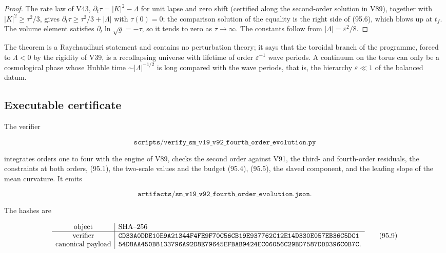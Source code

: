 \documentclass[11pt]{article}
\theoremstyle{remark}
\begin{document}
\begin{proof}
The rate law of V43, \(\partial_t\tau=|K|^2-\Lambda\) for unit lapse
and zero shift (certified along the second-order solution in V89),
together with \(|K|^2\geq\tau^2/3\), gives
\(\partial_t\tau\geq\tau^2/3+|\Lambda|\) with \(\tau(0)=0\); the
comparison solution of the equality is the right side of (95.6),
which blows up at \(t_f\).  The volume element satisfies
\(\partial_t\ln\sqrt g=-\tau\), so it tends to zero as
\(\tau\to\infty\).  The constants follow from \(|\Lambda|=\varepsilon^2/8\).
\end{proof}

The theorem is a Raychaudhuri statement and contains no perturbation
theory; it says that the toroidal branch of the programme, forced to
\(\Lambda<0\) by the rigidity of V39, is a recollapsing universe with
lifetime of order \(\varepsilon^{-1}\) wave periods.  A continuum on
the torus can only be a cosmological phase whose Hubble time
\(\sim|\Lambda|^{-1/2}\) is long compared with the wave periods, that
is, the hierarchy \(\varepsilon\ll1\) of the balanced datum.

\subsection{Executable certificate}

The verifier

\[
 \texttt{scripts/verify\_sm\_v19\_v92\_fourth\_order\_evolution.py}  \tag{95.7}
\]

integrates orders one to four with the engine of V89, checks the
second order against V91, the third- and fourth-order residuals, the
constraints at both orders, (95.1), the two-scale values and the
budget (95.4), (95.5), the slaved component, and the leading slope of
the mean curvature.  It emits

\[
 \texttt{artifacts/sm\_v19\_v92\_fourth\_order\_evolution.json}.     \tag{95.8}
\]

The hashes are

\[
\begin{array}{c|l}
\hbox{object}&\hbox{SHA--256}\\ \hline
\hbox{verifier}&
\texttt{CD33A0DDE10E9A21344F4FE9F70C56CB19E937762C12E14D330E057EB36C5DC1}\\
\hbox{canonical payload}&
\texttt{54D8AA450B8133796A92D8E79645EFBAB9424EC06056C29BD7587DDD396C0B7C}.
\end{array}                                                     \tag{95.9}
\]
\end{document}
